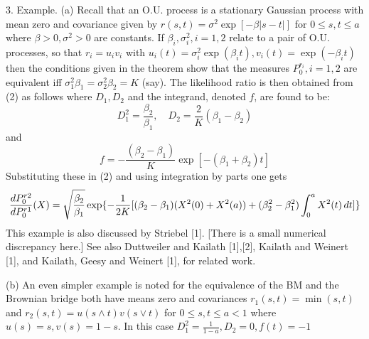 \documentclass{article}
\begin{document}
3. Example. (a) Recall that an O.U. process is a stationary Gaussian process
with mean zero and covariance given by $r (s, t) = \sigma^2 \exp [- \beta |s -
t|]$ for $0 \leq s, t \leq a$ where $\beta > 0, \sigma^2 > 0$ are constants.
If $\beta_i, \sigma^2_i, i = 1, 2$ relate to a pair of O.U. processes, so that
$r_i = u_i v_i$ with $u_i (t) = \sigma^2_i \exp (\beta_i t), v_i (t) = \exp (-
\beta_i t)$ then the conditions given in the theorem show that the measures
$P_0^{r_i}, i = 1, 2$ are equivalent iff $\sigma^2_1 \beta_1 = \sigma^2_2
\beta_2 = K$ (say). The likelihood ratio is then obtained from (2) as follows
where $D_1, D_2$ and the integrand, denoted $f$, are found to be:
\begin{equation}
  D^2_1 = \frac{\beta_2}{\beta_1}, \quad D_2 = \frac{2}{K}  (\beta_1 -
  \beta_2)
\end{equation}
and
\begin{equation}
  f = - \frac{(\beta_2 - \beta_1)}{K} \exp [- (\beta_1 + \beta_2) t]
\end{equation}
Substituting these in (2) and using integration by parts one gets
\[ \frac{dP_0^{r 2}}{dP_0^{r 1}} (X) = \sqrt{\frac{\beta_2}{\beta_1}} \exp \{-
   \frac{1}{2 K} [(\beta_2 - \beta_1) (X^2 (0) + X^2 (a)) + (\beta^2_2 -
   \beta^2_1) \int_0^a X^2 (t) \hspace{0.17em} dt]\} \]
This example is also discussed by Striebel [1]. [There is a small numerical
discrepancy here.] See also Duttweiler and Kailath [1],[2], Kailath and
Weinert [1], and Kailath, Geesy and Weinert [1], for related work.

(b) An even simpler example is noted for the equivalence of the BM and the
Brownian bridge both have means zero and covariances $r_1  (s, t) = \min (s,
t)$ and $r_2  (s, t) = u (s \wedge t) v (s \vee t)$ for $0 \leq s, t \leq a <
1$ where $u (s) = s, v (s) = 1 - s$. In this case $D^2_1 = \frac{1}{1 - a},
D_2 = 0, f (t) = - 1$
\end{document}

